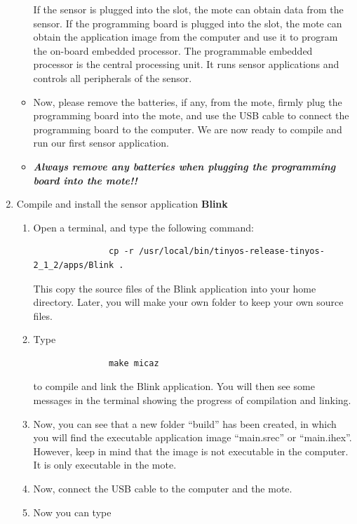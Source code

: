 \documentclass[letterpaper,12pt]{article}
\begin{document}
\begin{enumerate}
\begin{itemize}
               If the sensor is plugged into the slot, the mote can obtain data from the
               sensor. If the programming board is plugged into the slot, the mote can
               obtain the application image from the computer and use it to program the on-board
               embedded processor. The programmable embedded processor is the central
               processing unit. It runs sensor applications and controls all peripherals
               of the sensor.
         \item Now, please remove the batteries, if any, from the mote, firmly plug the programming
               board into the mote, and use the USB cable to connect the programming board
               to the computer. We are now ready to compile and run our first sensor application.
         \item \emph{\textbf{Always remove any batteries when plugging the programming board into the mote!!}}
      \end{itemize}
   \item Compile and install the sensor application \textbf{Blink}
      \begin{enumerate}
         \item Open a terminal, and type the following command:
               \begin{lstlisting}
               cp -r /usr/local/bin/tinyos-release-tinyos-2_1_2/apps/Blink .
               \end{lstlisting}
               This copy the source files of the Blink application into your home directory.
               Later, you will make your own folder to keep your own source files.
         \item Type 
               \begin{lstlisting}
               make micaz
               \end{lstlisting}
               to compile and link the Blink application. You will then see some messages in
               the terminal showing the progress of compilation and linking.
         \item Now, you can see that a new folder “build” has been created, in
               which you will find the executable application image “main.srec” or “main.ihex”.
               However, keep in mind that the image is not executable in the computer.
               It is only executable in the mote.
         \item Now, connect the USB cable to the computer and the mote.
         \item Now you can type

\end{enumerate}
\end{enumerate}
\end{document}
